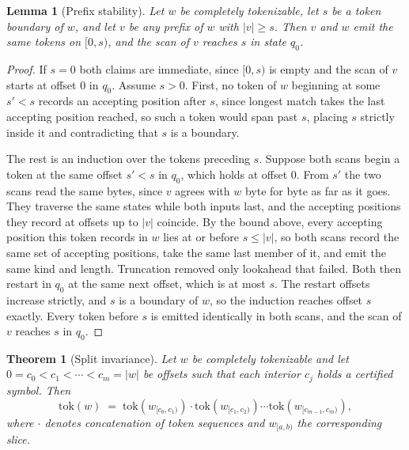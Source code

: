 \documentclass[11pt,a4paper]{article}
\theoremstyle{definition}
\theoremstyle{plain}
\newtheorem{lemma}{Lemma}
\newtheorem{theorem}{Theorem}
\begin{document}
\begin{lemma}[Prefix stability]
\label{lem:truncation}
Let $w$ be completely tokenizable, let $s$ be a token boundary of $w$, and let $v$ be any prefix of $w$ with
$|v| \geq s$. Then $v$ and $w$ emit the same tokens on $[0, s)$, and the scan of $v$ reaches $s$ in state $q_0$.
\end{lemma}

\begin{proof}
If $s = 0$ both claims are immediate, since $[0, s)$ is empty and the scan of $v$ starts at offset $0$ in $q_0$. Assume
$s > 0$. First, no token of $w$ beginning at some $s' < s$ records an accepting position after $s$, since longest match
takes the last accepting position reached, so such a token would span past $s$, placing $s$ strictly inside it and
contradicting that $s$ is a boundary.

The rest is an induction over the tokens preceding $s$. Suppose both scans begin a token at the same offset $s' < s$ in
$q_0$, which holds at offset $0$. From $s'$ the two scans read the same bytes, since $v$ agrees with $w$ byte for byte
as far as it goes. They traverse the same states while both inputs last, and the accepting positions they record at
offsets up to $|v|$ coincide. By the bound above, every accepting position this token records in $w$ lies at or before
$s \leq |v|$, so both scans record the same set of accepting positions, take the same last member of it, and emit the
same kind and length. Truncation removed only lookahead that failed. Both then restart in $q_0$ at the same next offset,
which is at most $s$. The restart offsets increase strictly, and $s$ is a boundary of $w$, so the induction reaches
offset $s$ exactly. Every token before $s$ is emitted identically in both scans, and the scan of $v$ reaches $s$ in
$q_0$.
\end{proof}

\begin{theorem}[Split invariance]
\label{thm:main}
Let $w$ be completely tokenizable and let $0 = c_0 < c_1 < \cdots < c_m = |w|$ be offsets such that each interior $c_j$
holds a certified symbol. Then
\[
\mathrm{tok}(w) \;=\; \mathrm{tok}(w_{[c_0,c_1)}) \cdot \mathrm{tok}(w_{[c_1,c_2)}) \cdots
\mathrm{tok}(w_{[c_{m-1},c_m)}),
\]
where $\cdot$ denotes concatenation of token sequences and $w_{[a,b)}$ the corresponding slice.
\end{theorem}
\end{document}
